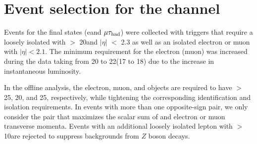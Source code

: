 \section{\texorpdfstring{Event selection for the \leptonTau channel}{Event selection for the lepton-tau channel}}
\label{sect:eleTauCuts}
Events for the \leptonTau final states (e\Tau and $\mu\tau_{\rm had}$)
were collected with triggers that require 
a loosely isolated \Tau with \PT $>$ 20\GeV and $|\eta|$ $<$ 2.3 as well as
an isolated electron or muon with $|\eta| < 2.1$.  The minimum
\PT requirement for the electron (muon) was increased during the data taking from 20 to 22\GeV (17 to 18\GeV)
due to the increase in instantaneous luminosity.

In the offline analysis, the electron, muon, and \Tau objects are required to have \PT $>$ 25, 20, and 25\GeV, respectively, 
while tightening the corresponding identification and isolation requirements.
In events with more than one opposite-sign \leptonTau pair, we only consider
 the pair that maximizes the scalar sum of \Tau and electron or muon 
transverse momenta.  Events with an additional loosely isolated lepton
with \PT $>$ 10\GeV are rejected to suppress backgrounds from $Z$ boson
decays.  

